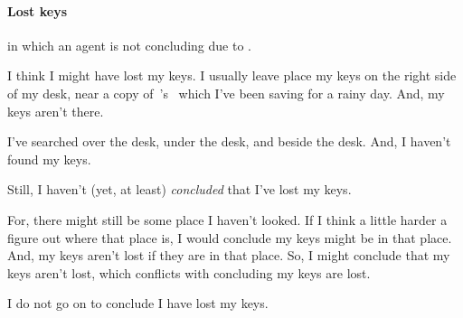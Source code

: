 \paragraph{Lost keys}

\begin{note}
   in which an agent is not concluding due to \requ{}.
\end{note}

\begin{note}
  \begin{illustration}
    \label{illu:lost-key}
    I think I might have lost my keys.
    I usually leave place my keys on the right side of my desk, near a copy of~\citeauthor{Vickers:1989tr}'s~ which I've been saving for a rainy day.
    And, my keys aren't there.

    I've searched over the desk, under the desk, and beside the desk.
    And, I haven't found my keys.

    Still, I haven't (yet, at least) \emph{concluded} that I've lost my keys.

    For, there might still be some place I haven't looked.
    If I think a little harder a figure out where that place is, I would conclude my keys might be in that place.
    And, my keys aren't lost if they are in that place.
    So, I might conclude that my keys aren't lost, which conflicts with concluding my keys are lost.

    I do not go on to conclude I have lost my keys.
  \end{illustration}
\end{note}

